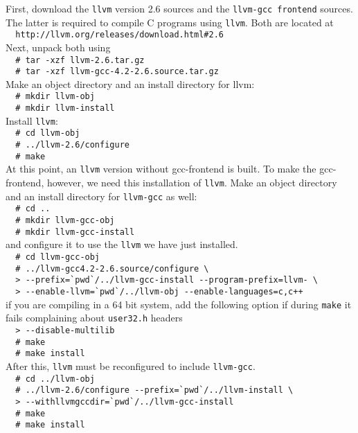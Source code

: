 First, download the \verb|llvm| version 2.6 sources and the
\verb|llvm-gcc frontend| sources.
The latter is required to compile C programs using \verb|llvm|.
Both are located at\\
\verb|  http://llvm.org/releases/download.html#2.6|\\
Next, unpack both using\\
\verb|  # tar -xzf llvm-2.6.tar.gz|\\
\verb|  # tar -xzf llvm-gcc-4.2-2.6.source.tar.gz|\\
Make an object directory and an install directory for llvm:\\
\verb|  # mkdir llvm-obj|\\
\verb|  # mkdir llvm-install|\\
Install \verb|llvm|:\\
\verb|  # cd llvm-obj|\\
\verb|  # ../llvm-2.6/configure|\\
\verb|  # make|\\
At this point, an \verb|llvm| version without gcc-frontend is built.
To make the gcc-frontend, however, we need this installation of \verb|llvm|.
Make an object directory and an install directory for \verb|llvm-gcc| as well:\\
\verb|  # cd ..|\\
\verb|  # mkdir llvm-gcc-obj|\\
\verb|  # mkdir llvm-gcc-install|\\
and configure it to use the \verb|llvm| we have just installed.\\
\verb|  # cd llvm-gcc-obj|\\
\verb|  # ../llvm-gcc4.2-2.6.source/configure \ |\\
\verb|  > --prefix=`pwd`/../llvm-gcc-install --program-prefix=llvm- \ |\\
\verb|  > --enable-llvm=`pwd`/../llvm-obj --enable-languages=c,c++ |\\
if you are compiling in a 64 bit system, add the following option if during
\verb|make| it fails complaining about \verb|user32.h| headers\\
\verb|  > --disable-multilib |\\
\verb|  # make|\\
\verb|  # make install|\\
After this, \verb|llvm| must be reconfigured to include \verb|llvm-gcc|.\\
\verb|  # cd ../llvm-obj|\\
\verb|  # ../llvm-2.6/configure --prefix=`pwd`/../llvm-install \ |\\
\verb|  > --withllvmgccdir=`pwd`/../llvm-gcc-install|\\
\verb|  # make |\\
\verb|  # make install |


